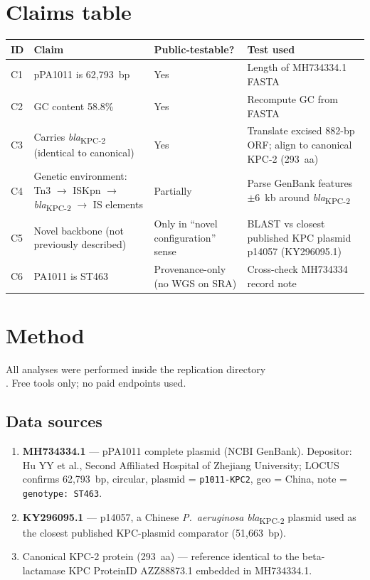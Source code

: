 \documentclass[11pt]{article}
\begin{document}
\section{Claims table}
\begin{longtable}{@{}p{}p{}p{}p{}@{}}
\toprule
ID & Claim & Public-testable? & Test used \\ \midrule
C1 & pPA1011 is 62{,}793~bp & Yes & Length of MH734334.1 FASTA \\
C2 & GC content 58.8\% & Yes & Recompute GC from FASTA \\
C3 & Carries \textit{bla}\textsubscript{KPC-2} (identical to canonical) & Yes & Translate excised 882-bp ORF; align to canonical KPC-2 (293~aa) \\
C4 & Genetic environment: Tn3 $\to$ ISKpn $\to$ \textit{bla}\textsubscript{KPC-2} $\to$ IS elements & Partially & Parse GenBank features $\pm 6$~kb around \textit{bla}\textsubscript{KPC-2} \\
C5 & Novel backbone (not previously described) & Only in ``novel configuration'' sense & BLAST vs closest published KPC plasmid p14057 (KY296095.1) \\
C6 & PA1011 is ST463 & Provenance-only (no WGS on SRA) & Cross-check MH734334 record note \\
\bottomrule
\end{longtable}

\section{Method}
All analyses were performed inside the replication directory \\
. Free tools only; no paid endpoints used.

\subsection{Data sources}
\begin{enumerate}[nosep]
  \item \textbf{MH734334.1} --- pPA1011 complete plasmid (NCBI GenBank). Depositor: Hu YY et al., Second Affiliated Hospital of Zhejiang University; LOCUS confirms 62{,}793~bp, circular, plasmid = \texttt{p1011-KPC2}, geo = China, note = \texttt{genotype: ST463}.
  \item \textbf{KY296095.1} --- p14057, a Chinese \textit{P.~aeruginosa} \textit{bla}\textsubscript{KPC-2} plasmid used as the closest published KPC-plasmid comparator (51{,}663~bp).
  \item Canonical KPC-2 protein (293~aa) --- reference identical to the beta-lactamase KPC ProteinID AZZ88873.1 embedded in MH734334.1.
\end{enumerate}
\end{document}
